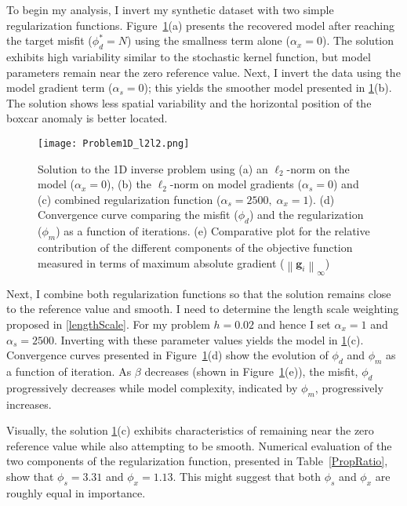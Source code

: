 To begin my analysis, I invert my synthetic dataset with two simple regularization functions. Figure~\ref{Problem1D_l2Result}(a) presents the recovered model after reaching the target misfit ($\phi_d^*=N$) using the smallness term alone ($\alpha_x=0$). The solution exhibits high variability similar to the stochastic kernel function, but model parameters remain near the zero reference value. Next, I invert the data using the model gradient term ($\alpha_s=0$); this yields the smoother model presented in \ref{Problem1D_l2Result}(b). The solution shows less spatial variability and the horizontal position of the boxcar anomaly is better located.
\begin{figure}
\texttt{[image: Problem1D\_l2l2.png]}
\caption{Solution to the 1D inverse problem using (a) an $\ell_2$-norm on the model ($\alpha_x = 0$), (b) the $\ell_2$-norm on model gradients ($\alpha_s=0$) and (c) combined regularization function ($\alpha_s=2500,\;\alpha_x = 1$). (d) Convergence curve comparing the misfit ($\phi_d$) and the regularization ($\phi_m$) as a function of iterations. (e) Comparative plot for the relative contribution of the different components of the objective function measured in terms of maximum absolute gradient ($\left\| \mathbf{g}_i \right\|_\infty$)}
\label{Problem1D_l2Result}
\end{figure}

Next, I combine both regularization functions so that the solution remains close to the reference value and smooth.
I need to determine the length scale weighting proposed in \eqref{lengthScale}.
For my problem $h=0.02$ and hence I set $\alpha_x=1$ and $\alpha_s=2500$.
Inverting with these parameter values yields the model in \ref{Problem1D_l2Result}(c). Convergence curves presented in Figure~\ref{Problem1D_l2Result}(d) show the evolution of $\phi_d$ and $\phi_m$ as a function of iteration. As $\beta$ decreases (shown in Figure~\ref{Problem1D_l2Result}(e)), the misfit, $\phi_d$ progressively decreases while model complexity, indicated by $\phi_m$, progressively increases.

Visually, the solution \ref{Problem1D_l2Result}(c) exhibits characteristics of remaining near the zero reference value while also attempting to be smooth. Numerical evaluation of the two components of the regularization function, presented in Table~\ref{PropRatio}, show that $\phi_s = 3.31$ and $\phi_x = 1.13$. This might suggest that both $\phi_s$ and $\phi_x$ are roughly equal in importance.


